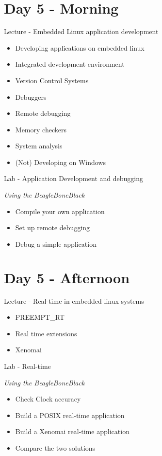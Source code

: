 \documentclass[a4paper,12pt,obeyspaces,spaces,hyphens]{article}
\begin{document}
\section{Day 5 - Morning}
\feagendatwocolumn
{Lecture - Embedded Linux application development}
{
  \begin{itemize}
  \item Developing applications on embedded linux
  \item Integrated development environment
  \item Version Control Systems
  \item Debuggers
  \item Remote debugging
  \item Memory checkers
  \item System analysis
  \item (Not) Developing on Windows
  \end{itemize}
}
{Lab - Application Development and debugging}
{
  {\em Using the BeagleBoneBlack}
  \begin{itemize}
  \item Compile your own application
  \item Set up remote debugging
  \item Debug a simple application
  \end{itemize}
}

\section{Day 5 - Afternoon}
\feagendatwocolumn
{Lecture - Real-time in embedded linux systems}
{
  \begin{itemize}
  \item PREEMPT\_RT
  \item Real time extensions
  \item Xenomai
  \end{itemize}
}
{Lab - Real-time}
{
  {\em Using the BeagleBoneBlack}
  \begin{itemize}
  \item Check Clock accuracy
  \item Build a POSIX real-time application 
  \item Build a Xenomai real-time application
  \item Compare the two solutions
  \end{itemize}
}
\end{document}

